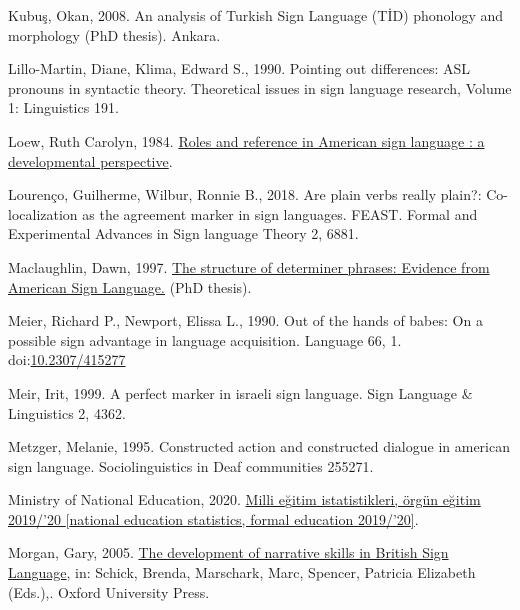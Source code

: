 \documentclass[]{elsarticle} %
\newlength{\cslhangindent}
\newenvironment{CSLReferences}[2] %
 {%
  \setlength{\parindent}{0pt}
  \ifodd #1 \everypar{\setlength{\hangindent}{\cslhangindent}}\ignorespaces\fi
  \ifnum #2 > 0
  \setlength{\parskip}{#2\baselineskip}
  \fi
 }%
 {}
\begin{document}
\begin{CSLReferences}{1}{0}
\leavevmode{}%
Kubuş, Okan, 2008. An analysis of Turkish Sign Language (T{İ}D)
phonology and morphology (PhD thesis). Ankara.

\leavevmode{}%
Lillo-Martin, Diane, Klima, Edward S., 1990. Pointing out differences:
ASL pronouns in syntactic theory. Theoretical issues in sign language
research, Volume 1: Linguistics 191.

\leavevmode{}%
Loew, Ruth Carolyn, 1984.
\href{https:///paper/Roles-and-reference-in-American-sign-language-\%3A-a-Loew/315c2c539d3bd88fbc13564775141ba4a60ac5aa}{Roles
and reference in American sign language : a developmental perspective}.

\leavevmode{}%
Lourenço, Guilherme, Wilbur, Ronnie B., 2018. Are plain verbs really
plain?: Co-localization as the agreement marker in sign languages.
FEAST. Formal and Experimental Advances in Sign language Theory 2, 6881.

\leavevmode{}%
Maclaughlin, Dawn, 1997.
\href{http://lear.unive.it/jspui/handle/11707/7016}{The structure of
determiner phrases: Evidence from American Sign Language.} (PhD thesis).

\leavevmode{}%
Meier, Richard P., Newport, Elissa L., 1990. Out of the hands of babes:
On a possible sign advantage in language acquisition. Language 66, 1.
doi:\href{https://doi.org/10.2307/415277}{10.2307/415277}

\leavevmode{}%
Meir, Irit, 1999. A perfect marker in israeli sign language. Sign
Language \& Linguistics 2, 4362.

\leavevmode{}%
Metzger, Melanie, 1995. Constructed action and constructed dialogue in
american sign language. Sociolinguistics in Deaf communities 255271.

\leavevmode{}%
Ministry of National Education, 2020.
\href{http://sgb.meb.gov.tr/meb_iys_dosyalar/2020_09/04144812_meb_istatistikleri_orgun_\%20egitim_2019_2020.pdf}{Milli
e{ğ}itim istatistikleri, örgün e{ğ}itim 2019/{'}20 {[}national education
statistics, formal education 2019/{'}20{]}}.

\leavevmode{}%
Morgan, Gary, 2005.
\href{http://www.oxfordscholarship.com/view/10.1093/acprof:oso/9780195180947.001.0001/acprof-9780195180947}{The
development of narrative skills in British Sign Language}, in: Schick,
Brenda, Marschark, Marc, Spencer, Patricia Elizabeth (Eds.),. Oxford
University Press.


\end{CSLReferences}
\end{document}
